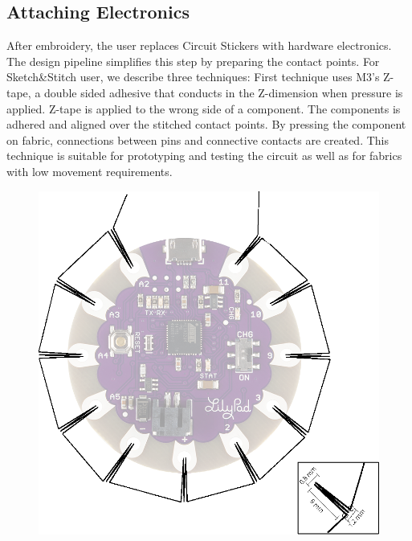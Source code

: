 \documentclass[header.tex]{subfiles}
\begin{document}
\subsection{Attaching Electronics}




After embroidery, the user replaces Circuit Stickers with hardware electronics. The design pipeline simplifies this step by preparing the contact points. 
For Sketch\&Stitch user, we describe three techniques: First technique uses M3's Z-tape, a double sided adhesive that conducts in the Z-dimension when pressure is applied. Z-tape is applied to the wrong side of a component. The components is adhered and aligned over the stitched contact points. By pressing the component on fabric, connections between pins and connective contacts are created. This technique is suitable for prototyping and testing the circuit as well as for fabrics with low movement requirements. 


\begin{figure}
\centering
  \includegraphics[width=0.7\columnwidth]{figures/LilyStitch}
  \caption{}~\label{fig:LilyStitch}
  \vspace{-2.5em}
\end{figure}
\end{document}
